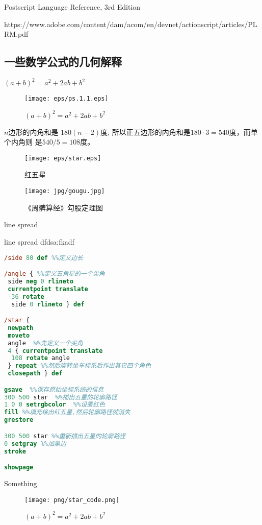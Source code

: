 \documentclass[main.tex]{subfiles}
\begin{document}
	Postscript Language Reference, 3rd Edition \cite{PSLF3}
	
	https://www.adobe.com/content/dam/acom/en/devnet/actionscript/articles/PLRM.pdf
	



	
	
	
\subsection{一些数学公式的几何解释}
$(a+b)^2 = a^2 + 2ab + b^2$


\begin{figure}[h]
    \centering
    \texttt{[image: eps/ps.1.1.eps]}
    \caption{$(a+b)^2 = a^2 + 2ab + b^2$}
    \label{fig:III.1.1}
\end{figure}

\begin{example} $n$边形的内角和是 $180(n-2)$度, 所以正五边形的内角和是$180\cdot 3 = 540$度，而单个内角则 是$540/5 = 108$度。
\end{example}

\begin{figure}[h]
	\centering
	\texttt{[image: eps/star.eps]}
	\caption{红五星}
	\label{fig:III.1.2}
\end{figure}

\begin{figure}[h]
	\centering
	\texttt{[image: jpg/gougu.jpg]}
	\caption{《周髀算经》勾股定理图}
	\label{fig:III.1.3}
\end{figure}

\iffalse
\begin{figure}[h]
	\centering
	
	\caption{圆盘}
	\label{fig:III.1.3}
\end{figure}
\fi

line spread

line spread
dfdsa;fkadf

\begin{spacing}{0.8}
\begin{lstlisting}[language=PostScript]
%!PS-Adobe-3.0
/side 80 def %%定义边长 

/angle { %%定义五角星的一个尖角
 side neg 0 rlineto
 currentpoint translate
 -36 rotate
  side 0 rlineto } def

/star {
 newpath
 moveto
 angle  %%先定义一个尖角
 4 { currentpoint translate
  108 rotate angle 
 } repeat %%然后旋转坐车标系后作出其它四个角色
 closepath } def

gsave  %%保存原始坐标系统的信息
300 500 star  %%描出五星的轮廓路径
1 0 0 setrgbcolor  %%设置红色
fill %%填充绘出红五星,然后轮廓路径就消失
grestore

300 500 star %%重新描出五星的轮廓路径
0 setgray %%加黑边
stroke

showpage
\end{lstlisting}
\end{spacing}



Something
\begin{figure}[h]
	\centering
	\texttt{[image: png/star\_code.png]}
	\caption{$(a+b)^2 = a^2 + 2ab + b^2$}
	\label{fig:III.1.3}
\end{figure}
\end{document}

